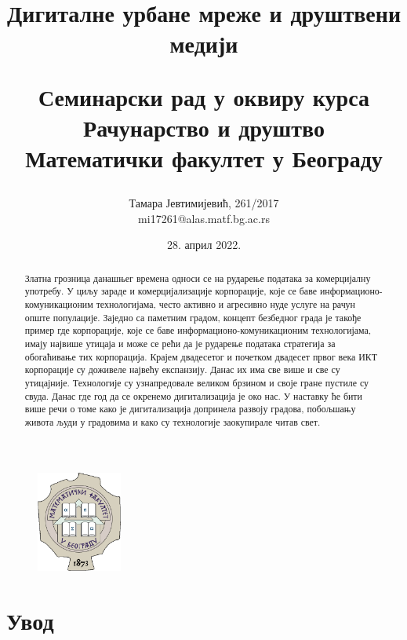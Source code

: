 \documentclass{article}
\title{\textbf{Дигиталне урбане мреже и друштвени медији}

\vspace{10}
\small{Семинарски рад у оквиру курса \\Рачунарство и друштво \\
        Математички факултет у Београду}}
\author{Тамара Јевтимијевић, 261/2017\\mi17261@alas.matf.bg.ac.rs}
\date{28. април 2022.}
\begin{document}
\maketitle

\begin{figure}[h!]
\centering
\includegraphics[width=0.25\textwidth]{slike/grb.png}
\end{figure}

\vspace{30}
\begin{abstract}
Златна грозница данашњег времена односи се на рударење података за комерцијалну употребу. У циљу зараде и комерцијализације корпорације, које се баве информационо-комуникационим технологијама, често активно и агресивно нуде услуге на рачун опште популације. Заједно са паметним градом, концепт безбедног града је такође пример где корпорације, које се баве информационо-комуникационим технологијама, имају највише утицаја и може се рећи да је рударење података стратегија за обогаћивање тих корпорација. Крајем двадесетог и почетком двадесет првог века ИКТ корпорације су доживеле највећу експанзију. Данас их има све више и све су утицајније. Технологије су узнапредовале великом брзином и своје гране пустиле су свуда. Данас где год да се окренемо дигитализација је око нас. У наставку ће бити више речи о томе како је дигитализација допринела развоју градова, побољшању живота људи у градовима и како су технологије заокупирале читав свет.
\end{abstract}

\newpage
\tableofcontents

\newpage
\section{Увод}
\end{document}
